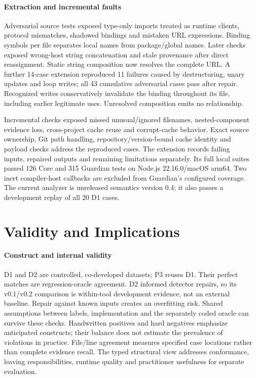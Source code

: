 \paragraph{Extraction and incremental faults} Adversarial source tests exposed type-only imports treated as runtime clients, protocol mismatches, shadowed bindings and mistaken URL expressions. Binding symbols per file separates local names from package/global names. Later checks exposed wrong-host string concatenation and stale provenance after direct reassignment. Static string composition now resolves the complete URL. A further 14-case extension reproduced 11 failures caused by destructuring, unary updates and loop writes; all 43 cumulative adversarial cases pass after repair. Recognized writes conservatively invalidate the binding throughout its file, including earlier legitimate uses. Unresolved composition emits no relationship.

Incremental checks exposed missed unusual/ignored filenames, nested-component evidence loss, cross-project cache reuse and corrupt-cache behavior. Exact source ownership, Git path handling, repository/version-bound cache identity and payload checks address the reproduced cases. The extension records failing inputs, repaired outputs and remaining limitations separately. Its full local suites passed 126 Core and 315 Guardian tests on Node.js 22.16.0/macOS arm64. Two inert compiler-host callbacks are excluded from Guardian's configured coverage. The current analyzer is unreleased semantics version 0.4; it also passes a development replay of all 20 D1 cases.

\section{Validity and Implications}\label{sec:validity}
\begin{sloppypar}
\paragraph{Construct and internal validity} D1 and D2 are controlled, co-developed datasets; P3 reuses D1. Their perfect matches are regression-oracle agreement. D2 informed detector repairs, so its v0.1/v0.2 comparison is within-tool development evidence, not an external baseline. Repair against known inputs creates an overfitting risk. Shared assumptions between labels, implementation and the separately coded oracle can survive these checks. Handwritten positives and hard negatives emphasize anticipated constructs; their balance does not estimate the prevalence of violations in practice. File/line agreement measures specified case locations rather than complete evidence recall. The typed structural view addresses conformance, leaving responsibilities, runtime quality and practitioner usefulness for separate evaluation.
\end{sloppypar}

